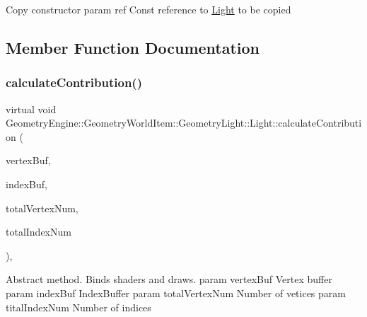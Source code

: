 Copy constructor param ref Const reference to \mbox{\hyperlink{class_geometry_engine_1_1_geometry_world_item_1_1_geometry_light_1_1_light}{Light}} to be copied 

\subsection{Member Function Documentation}
\mbox{\label{class_geometry_engine_1_1_geometry_world_item_1_1_geometry_light_1_1_light_a58aa2a3520f7aa2b03afcb4123e7530a}} 
\subsubsection{\texorpdfstring{calculateContribution()}{calculateContribution()}}
{\footnotesize\ttfamily virtual void Geometry\+Engine\+::\+Geometry\+World\+Item\+::\+Geometry\+Light\+::\+Light\+::calculate\+Contribution (\begin{DoxyParamCaption}\item[{Q\+Open\+G\+L\+Buffer $\ast$}]{vertex\+Buf,  }\item[{Q\+Open\+G\+L\+Buffer $\ast$}]{index\+Buf,  }\item[{unsigned int}]{total\+Vertex\+Num,  }\item[{unsigned int}]{total\+Index\+Num }\end{DoxyParamCaption})\hspace{0.3cm}{\ttfamily [protected]}, {}}

Abstract method. Binds shaders and draws. param vertex\+Buf Vertex buffer param index\+Buf Index\+Buffer param total\+Vertex\+Num Number of vetices param tital\+Index\+Num Number of indices 

